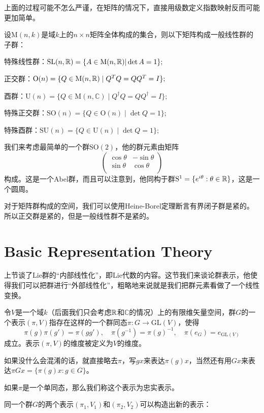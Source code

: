 \documentclass[9pt]{extarticle}
\newcommand{\cc}{\mathbb{C}}
\begin{document}
上面的过程可能不怎么严谨，在矩阵的情况下，直接用级数定义指数映射反而可能更加简单。

\para 设$\mathrm{M}(n,k)$是域$k$上的$n\times n$矩阵全体构成的集合，则以下矩阵构成一般线性群的子群：

 特殊线性群：$\mathrm{SL}(n,\mathbb{R})=\{A\in \mathrm{M}(n,\mathbb{R})|\det A=1\};$

 正交群：$\mathrm{O}(n) = \{ Q \in \mathrm{M}(n,\mathbb{R}) \mid Q^T Q = Q Q^T = I \};$

 酉群：$\mathrm{U}(n) = \{ Q \in \mathrm{M}(n,\cc) \mid Q^\dag Q = Q Q^\dag = I \};$

 特殊正交群：$\mathrm{SO}(n) =\{ Q \in \mathrm{O}(n) \mid \det Q=1 \};$

 特殊酉群：$\mathrm{SU}(n) =\{ Q \in \mathrm{U}(n) \mid \det Q=1 \};$

我们来考虑最简单的一个群$\mathrm{SO}(2)$，他的群元素由矩阵
\[
	\begin{pmatrix}
	\cos \theta&-\sin \theta\\
	\sin \theta&\cos \theta\\
	\end{pmatrix}
\]
构成。这是一个Abel群，而且可以注意到，他同构于群$\mathrm{S}^1=\{e^{i\theta}:\theta\in\mathbb{R}\}$，这是一个圆周。

\pro 对于矩阵群构成的空间，我们可以使用Heine-Borel定理断言有界闭子群是紧的。所以正交群是紧的，但是一般线性群不是紧的。

\section{Basic Representation Theory}

上节谈了Lie群的“内部线性化”，即Lie代数的内容。这节我们来谈论群表示，他使得我们可以把群进行“外部线性化”，粗略地来说就是我们把群元素看做了一个线性变换。

\para 令$V$是一个域$k$（后面我们只会考虑$\mathbb{R}$和$\cc$的情况）上的有限维矢量空间，群$G$的一个表示$(\pi, V)$指存在这样的一个群同态$\pi:G\rightarrow \mathrm{GL}(V)$，使得
\[
	\pi(g)\pi(g')=\pi(gg'),\quad \pi(g^{-1})=\pi(g)^{-1},\quad \pi(e_G)=e_{\mathrm{GL}(V)}
\]
成立。表示$(\pi, V)$的维度被定义为$V$的维度。

如果没什么会混淆的话，就直接略去$\pi$，写$gx$来表达$\pi(g)x$，当然还有用$Gx$来表达$\pi{G}x=\{\pi(g)x:g\in G\}$。

如果$\pi$是一个单同态，那么我们称这个表示为忠实表示。

\para 同一个群$G$的两个表示$(\pi_1,V_1)$和$(\pi_2,V_2)$可以构造出新的表示：
\end{document}
